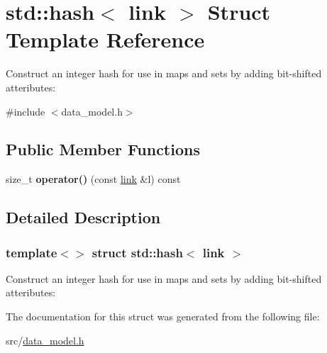 \hypertarget{structstd_1_1hash_3_01link_01_4}{}\section{std\+:\+:hash$<$ link $>$ Struct Template Reference}
\label{structstd_1_1hash_3_01link_01_4}


Construct an integer hash for use in maps and sets by adding bit-\/shifted atteributes\+:  




{\ttfamily \#include $<$data\+\_\+model.\+h$>$}

\subsection*{Public Member Functions}
\begin{DoxyCompactItemize}
\item 
\mbox{\label{structstd_1_1hash_3_01link_01_4_a8fa2e70ae6c22fd0234a24ede888b3c1}} 
size\+\_\+t {\bfseries operator()} (const \hyperlink{structtricl_1_1link}{link} \&l) const
\end{DoxyCompactItemize}


\subsection{Detailed Description}
\subsubsection*{template$<$$>$\newline
struct std\+::hash$<$ link $>$}

Construct an integer hash for use in maps and sets by adding bit-\/shifted atteributes\+: 

The documentation for this struct was generated from the following file\+:\begin{DoxyCompactItemize}
\item 
src/\hyperlink{data__model_8h}{data\+\_\+model.\+h}\end{DoxyCompactItemize}
